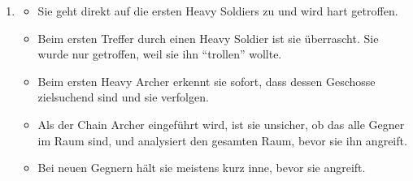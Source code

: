 \documentclass[../Main.tex]{subfiles}
\begin{document}
\begin{enumerate}[label=\textbf{B\arabic*}, leftmargin=1.5cm, itemsep=0.8em, resume]
    \item
        \begin{itemize}[nosep]
            \item Sie geht direkt auf die ersten Heavy Soldiers zu und wird hart getroffen.
            \item Beim ersten Treffer durch einen Heavy Soldier ist sie überrascht. Sie wurde nur getroffen, weil sie ihn \enquote{trollen} wollte.
            \item Beim ersten Heavy Archer erkennt sie sofort, dass dessen Geschosse zielsuchend sind und sie verfolgen.
            \item Als der Chain Archer eingeführt wird, ist sie unsicher, ob das alle Gegner im Raum sind, und analysiert den gesamten Raum, bevor sie ihn angreift.
            \item Bei neuen Gegnern hält sie meistens kurz inne, bevor sie angreift.
        \end{itemize}
\end{enumerate}
\end{document}
